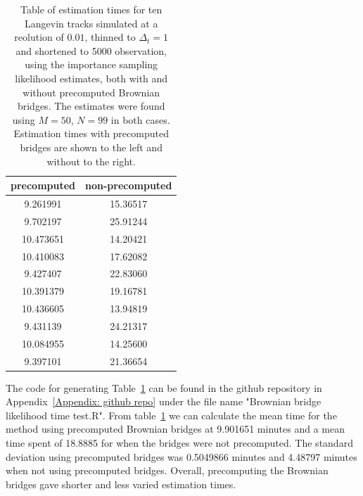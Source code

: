 \begin{table}[H]
    \centering
    \begin{tabular}{c|c}
        precomputed & non-precomputed \\
        \hline
        9.261991 & 15.36517 \\
        9.702197 & 25.91244 \\
        10.473651 & 14.20421 \\
        10.410083 & 17.62082 \\
        9.427407 & 22.83060 \\
        10.391379 & 19.16781 \\
        10.436605 & 13.94819 \\
        9.431139 & 24.21317 \\
        10.084955 & 14.25600 \\
        9.397101  & 21.36654 \\
    \end{tabular}
    \caption[table of estimation times with and without precomputation of Brownian bridges]{Table of estimation times for ten Langevin tracks simulated at a reolution of $0.01$, thinned to $\Delta_t = 1$ and shortened to 5000 observation, using the importance sampling likelihood estimates, both with and without precomputed Brownian bridges. The estimates were found using $M=50$, $N = 99$ in both cases. Estimation times with precomputed bridges are shown to the left and without to the right.}
    \label{tab: times}
\end{table}


The code for generating Table~\ref{tab: times} can be found in the github repository in Appendix~\ref{Appendix: github repo} under the file name "Brownian bridge likelihood time test.R". From table~\ref{tab: times} we can calculate the mean time for the method using precomputed Brownian bridges at 9.901651 minutes and a mean time spent of 18.8885 for when the bridges were not precomputed. The standard deviation using precomputed bridges was 0.5049866 minutes and 4.48797 minutes when not using precomputed bridges. Overall, precomputing the Brownian bridges gave shorter and less varied estimation times.





